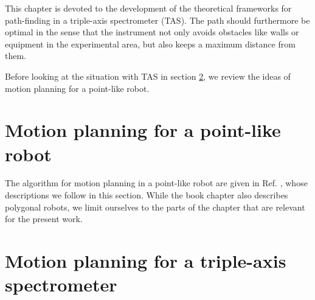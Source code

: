 %
%

This chapter is devoted to the development of the theoretical frameworks for path-finding in a triple-axis spectrometer (TAS). 
The path should furthermore be optimal in the sense that the instrument not only avoids obstacles like walls or equipment in 
the experimental area, but also keeps a maximum distance from them.

Before looking at the situation with TAS in section \ref{sec:tasrobot}, we review the ideas of motion planning for a point-like robot.



\section{Motion planning for a point-like robot}
\label{sec:pointrobot}

The algorithm for motion planning in a point-like robot are given in Ref. \cite[Ch. 13, pp. 283-306]{Berg2008}, whose descriptions 
we follow in this section. While the book chapter also describes polygonal robots, we limit ourselves to the parts of the chapter 
that are relevant for the present work.





\section{Motion planning for a triple-axis spectrometer}
\label{sec:tasrobot}

